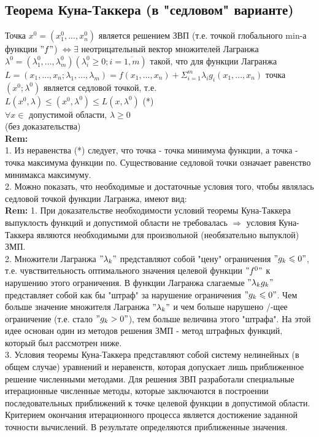 \subsection*{Теорема Куна-Таккера (в "седловом" варианте)}
Точка $x^0 = (x_1^0, ..., x_n^0)$ является решением ЗВП (т.е. точкой глобального min-а функции $"f"$) $\Leftrightarrow \exists$ неотрицательный вектор множителей Лагранжа \\
$\lambda^0 = (\lambda_1^0, ... , \lambda_m^0) (\lambda_i^0 \geqslant 0; i = \overline{1, m})$ такой, что для функции Лагранжа \\
$L = (x_1, ..., x_n; \lambda_1, ..., \lambda_m) = f(x_1, ... , x_n) + \Sigma_{i = 1}^m \lambda_i g_i (x_1, ... , x_n)$ точка $(x^0; \lambda^0)$ является седловой точкой, т.е. \\
$L(x^0, \lambda) \leqslant (x^0, \lambda^0) \leqslant L(x, \lambda^0)$ (*) \\
$\forall x \in$ допустимой области, $\lambda \geqslant 0$ \\
(без доказательства) \\

\textbf{Rem:} \\
1. Из неравенства (*) следует, что точка - точка минимума функции, а точка - точка максимума функции по. Существование седловой точки означает равенство минимакса максимуму. \\
2. Можно показать, что необходимые и достаточные условия того, чтобы являлась седловой точкой функции Лагранжа, имеют вид: \\

\textbf{Rem: }
1. При доказательстве необходимости условий теоремы Куна-Таккера выпуклость функций и допустимой области не требовалась $\Rightarrow$ условия Куна-Таккера являются необходимыми для произвольной (необязательно выпуклой) ЗМП. \\
2. Множители Лагранжа $"\lambda_k"$ представляют собой "цену" ограничения $"g_k \leqslant 0"$, т.е. чувствительность оптимального значения целевой функции $"f^0"$ к нарушению этого ограничения. В функции Лагранжа слагаемые $"\lambda_k g_k"$ представляет собой как бы "штраф" за нарушение ограничения $"g_k \leqslant 0"$. Чем больше значение множителя Лагранжа $"\lambda_k"$ и чем больше нарушено /-щее ограничение (т.е. стало $"g_k > 0"$), тем больше величина этого "штрафа". На этой идее основан один из методов решения ЗМП - метод штрафных функций, который был рассмотрен ниже. \\

3. Условия теоремы Куна-Таккера представляют собой систему нелинейных (в общем случае) уравнений и неравенств, которая допускает лишь приближенное решение численными методами. Для решения ЗВП разработали специальные итерационные численные методы, которые заключаются в построении последовательных приближений к точке целевой функции в допустимой области. Критерием окончания итерационного процесса является достижение заданной точности вычислений. В результате определяются приближенные значения. \\

